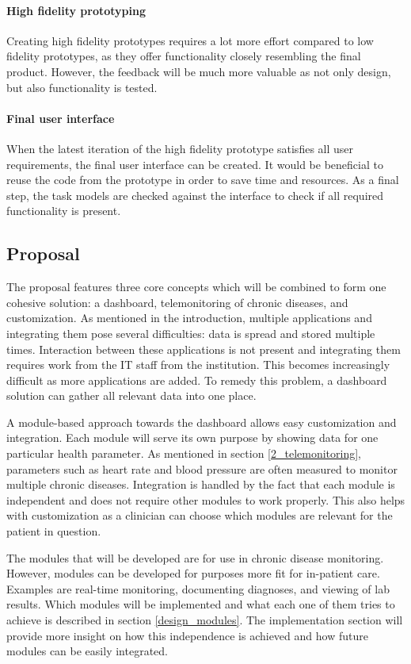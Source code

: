         \paragraph{High fidelity prototyping} Creating high fidelity prototypes requires a lot more effort compared to low fidelity prototypes, as they offer functionality closely resembling the final product. However, the feedback will be much more valuable as not only design, but also functionality is tested.

        \paragraph{Final user interface} When the latest iteration of the high fidelity prototype satisfies all user requirements, the final user interface can be created. It would be beneficial to reuse the code from the prototype in order to save time and resources. As a final step, the task models are checked against the interface to check if all required functionality is present.

    \subsection{Proposal}
    
    The proposal features three core concepts which will be combined to form one cohesive solution: a dashboard, telemonitoring of chronic diseases, and customization. As mentioned in the introduction, multiple applications and integrating them pose several difficulties: data is spread and stored multiple times. Interaction between these applications is not present and integrating them requires work from the IT staff from the institution. This becomes increasingly difficult as more applications are added. To remedy this problem, a dashboard solution can gather all relevant data into one place.

    A module-based approach towards the dashboard allows easy customization and integration. Each module will serve its own purpose by showing data for one particular health parameter. As mentioned in section \ref{2_telemonitoring}, parameters such as heart rate and blood pressure are often measured to monitor multiple chronic diseases. Integration is handled by the fact that each module is independent and does not require other modules to work properly. This also helps with customization as a clinician can choose which modules are relevant for the patient in question.

    The modules that will be developed are for use in chronic disease monitoring. However, modules can be developed for purposes more fit for in-patient care. Examples are real-time monitoring, documenting diagnoses, and viewing of lab results. Which modules will be implemented and what each one of them tries to achieve is described in section \ref{design_modules}. The implementation section will provide more insight on how this independence is achieved and how future modules can be easily integrated.


